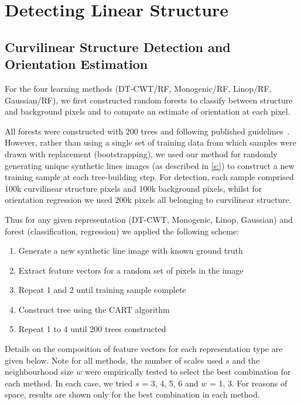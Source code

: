 \chapter{Detecting Linear Structure}





\section{Curvilinear Structure Detection and Orientation Estimation}

For the four learning methods (DT-CWT/RF, Monogenic/RF, Linop/RF, Gaussian/RF), we first constructed random forests to classify between structure and background pixels and to compute an estimate of orientation at each pixel.

All forests were constructed with 200 trees and following published guidelines~\cite{Breiman_ML01}. However, rather than using a single set of training data from which samples were drawn with replacement (\ie bootstrapping), we used our method for randomly generating unique synthetic lines images (as described in \ref{s:}) to construct a new training sample at each tree-building step. For detection, each sample comprised 100k curvilinear structure pixels and 100k background pixels, whilst for orientation regression we used 200k pixels all belonging to curvilinear structure. 

Thus for any given representation (DT-CWT, Monogenic, Linop, Gaussian) and forest (classification, regression) we applied the following scheme:

\begin{enumerate}
\item	Generate a new synthetic line image with known ground truth
\item Extract feature vectors for a random set of pixels in the image
\item Repeat 1 and 2 until training sample complete
\item Construct tree using the CART algorithm
\item Repeat 1 to 4 until 200 trees constructed
\end{enumerate}

Details on the composition of feature vectors for each representation type are given below. Note for all methods, the number of scales used $s$ and the neighbourhood size $w$ were empirically tested to select the best combination for each method. In each case, we tried $s$ = 3, 4, 5, 6 and $w$ = 1, 3. For reasons of space, results are shown only for the best combination in each method.

